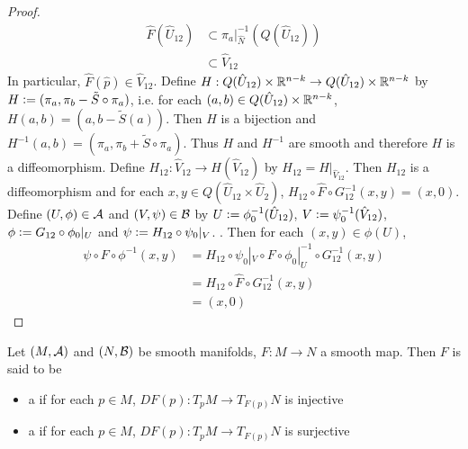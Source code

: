 \documentclass{book}
\begin{document}
\begin{proof}
	 	\begin{align*}
	 		\hat{F} (\hat{U}_{12}) 
	 		& \subset \pi_a|_{\hat{N}}^{-1}(Q(\hat{U}_{12})) \\
	 		& \subset \hat{V}_{12}
	 	\end{align*}
	 	In particular, $\hat{F}(\hat{p}) \in \hat{V}_{12}$. Define $H: Q(\hat{U}_{12}) \times \mathbb{R}^{n-k} \rightarrow Q(\hat{U}_{12}) \times \mathbb{R}^{n-k}$ by $H \vcentcolon= (\pi_a, \pi_b - \tilde{S} \circ \pi_a)$, i.e. for each $(a,b) \in Q(\hat{U}_{12}) \times \mathbb{R}^{n-k}$, $H(a,b) = (a, b-\tilde{S}(a))$. Then $H$ is a bijection and $H^{-1}(a,b) = (\pi_a, \pi_b + \tilde{S} \circ \pi_a)$. Thus $H$ and $H^{-1}$ are smooth and therefore $H$ is a diffeomorphism. Define $H_{12}: \hat{V}_{12} \rightarrow H(\hat{V}_{12})$ by 
	 	$H_{12} = H|_{\hat{V}_{12}}$. Then $H_{12}$ is a diffeomorphism and for each $x,y \in Q(\hat{U}_{12} \times \hat{U}_{2})$, $H_{12} \circ \hat{F} \circ G_{12}^{-1}(x, y) = (x, 0)$. Define $(U, \phi) \in \mathcal{A}$ and $(V, \psi) \in \mathcal{B}$ by $U \vcentcolon= \phi_0^{-1}(\hat{U}_{12})$, $V \vcentcolon= \psi_0^{-1}(\hat{V}_{12})$, $\phi \vcentcolon= G_{12} \circ \phi_0|_{U}$ and $\psi \vcentcolon= H_{12} \circ \psi_0|_V$. . Then for each $(x,y) \in \phi(U)$,
	 	\begin{align*}
	 		\psi \circ F \circ \phi^{-1}(x, y)
	 		& = H_{12} \circ \psi_0|_V \circ F \circ \phi_0|_U^{-1} \circ G_{12}^{-1} (x,y) \\
	 		& = H_{12} \circ \hat{F} \circ G_{12}^{-1}(x,y) \\
	 		& = (x, 0)
	 	\end{align*}
	\end{proof}
	
	\begin{defn} 
		Let $(M, \mathcal{A})$ and $(N, \mathcal{B})$ be smooth manifolds, $F: M \rightarrow N$ a smooth map. Then $F$ is said to be 
		\begin{itemize}
		
			\item a  if for each $p \in M$, $DF(p):T_pM\rightarrow T_{F(p)}N$ is injective
			\item a  if for each $p \in M$, $DF(p) :T_pM\rightarrow T_{F(p)}N$ is surjective
		\end{itemize}
	\end{defn}
\end{document}
